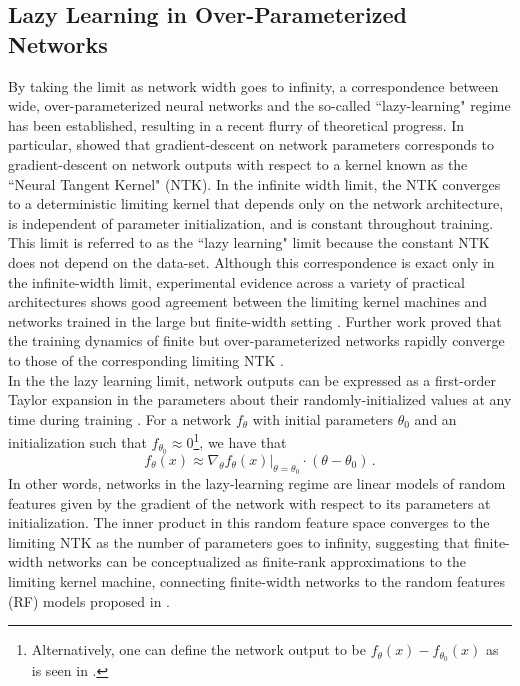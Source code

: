 \documentclass[11pt]{article}
\begin{document}
\subsection{Lazy Learning in Over-Parameterized Networks}

By taking the limit as network width goes to infinity, a correspondence between wide, over-parameterized neural networks and the so-called ``lazy-learning" regime has been established, resulting in a recent flurry of theoretical progress. In particular, \cite{jacotNeuralTangentKernel2018} showed that gradient-descent on network parameters corresponds to gradient-descent on network outputs with respect to a kernel known as the ``Neural Tangent Kernel" (NTK). In the infinite width limit, the NTK converges to a deterministic limiting kernel that depends only on the network architecture, is independent of parameter initialization, and is constant throughout training. This limit is referred to as the ``lazy learning" limit because the constant NTK does not depend on the data-set. Although this correspondence is exact only in the infinite-width limit, experimental evidence across a variety of practical architectures shows good agreement between the limiting kernel machines and networks trained in the large but finite-width setting \cite{jacotNeuralTangentKernel2018}. Further work proved that the training dynamics of finite but over-parameterized networks rapidly converge to those of the corresponding limiting NTK \cite{allen-zhuConvergenceTheoryDeep2019}.\\

In the the lazy learning limit, network outputs can be expressed as a first-order Taylor expansion in the parameters about their randomly-initialized values at any time during training \cite{leeWideNeuralNetworks2019}. For a network $f_\theta$ with initial parameters $\theta_0$ and an initialization such that $f_{\theta_0} \approx 0$\footnote{Alternatively, one can define the network output to be $f_{\theta}(x) - f_{\theta_0}(x)$ as is seen in \cite{chizatLazyTrainingDifferentiable2020}.}, we have that
\begin{equation}
    f_\theta(x) \approx \nabla_\theta \left.f_\theta(x)\right|_{\theta=\theta_0} \cdot (\theta - \theta_0)\,.
    \label{lazylinear}
\end{equation}
In other words, networks in the lazy-learning regime are linear models of random features given by the gradient of the network with respect to its parameters at initialization. The inner product in this random feature space converges to the limiting NTK as the number of parameters goes to infinity, suggesting that finite-width networks can be conceptualized as finite-rank approximations to the limiting kernel machine, connecting finite-width networks to the random features (RF) models proposed in \cite{rahimiRandomFeaturesLargeScale2008}.
\end{document}

